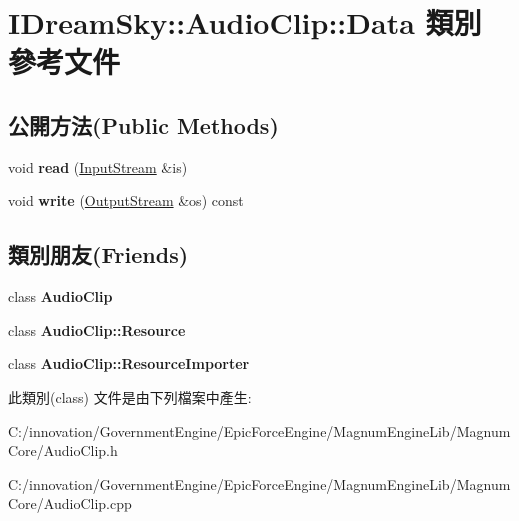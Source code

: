 \hypertarget{class_i_dream_sky_1_1_audio_clip_1_1_data}{}\section{I\+Dream\+Sky\+:\+:Audio\+Clip\+:\+:Data 類別 參考文件}
\label{class_i_dream_sky_1_1_audio_clip_1_1_data}
\subsection*{公開方法(Public Methods)}
\begin{DoxyCompactItemize}
\item 
void {\bfseries read} (\hyperlink{class_i_dream_sky_1_1_input_stream}{Input\+Stream} \&is)\hypertarget{class_i_dream_sky_1_1_audio_clip_1_1_data_a3550977f63c32b69ca8e9fcb969626fd}{}\label{class_i_dream_sky_1_1_audio_clip_1_1_data_a3550977f63c32b69ca8e9fcb969626fd}

\item 
void {\bfseries write} (\hyperlink{class_i_dream_sky_1_1_output_stream}{Output\+Stream} \&os) const \hypertarget{class_i_dream_sky_1_1_audio_clip_1_1_data_a8439eebdc236289cc3fc9e5635b1609f}{}\label{class_i_dream_sky_1_1_audio_clip_1_1_data_a8439eebdc236289cc3fc9e5635b1609f}

\end{DoxyCompactItemize}
\subsection*{類別朋友(Friends)}
\begin{DoxyCompactItemize}
\item 
class {\bfseries Audio\+Clip}\hypertarget{class_i_dream_sky_1_1_audio_clip_1_1_data_a9d56e3679258061c40e71e5321153525}{}\label{class_i_dream_sky_1_1_audio_clip_1_1_data_a9d56e3679258061c40e71e5321153525}

\item 
class {\bfseries Audio\+Clip\+::\+Resource}\hypertarget{class_i_dream_sky_1_1_audio_clip_1_1_data_aad8a33fb5708dac27c0354a31a2e386d}{}\label{class_i_dream_sky_1_1_audio_clip_1_1_data_aad8a33fb5708dac27c0354a31a2e386d}

\item 
class {\bfseries Audio\+Clip\+::\+Resource\+Importer}\hypertarget{class_i_dream_sky_1_1_audio_clip_1_1_data_a61e6e8f5b764bb025ab23de0a1f690d5}{}\label{class_i_dream_sky_1_1_audio_clip_1_1_data_a61e6e8f5b764bb025ab23de0a1f690d5}

\end{DoxyCompactItemize}


此類別(class) 文件是由下列檔案中產生\+:\begin{DoxyCompactItemize}
\item 
C\+:/innovation/\+Government\+Engine/\+Epic\+Force\+Engine/\+Magnum\+Engine\+Lib/\+Magnum\+Core/Audio\+Clip.\+h\item 
C\+:/innovation/\+Government\+Engine/\+Epic\+Force\+Engine/\+Magnum\+Engine\+Lib/\+Magnum\+Core/Audio\+Clip.\+cpp\end{DoxyCompactItemize}
